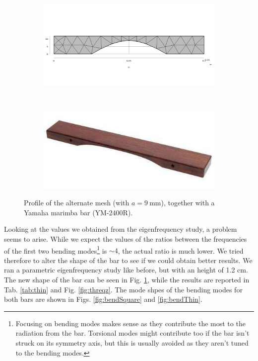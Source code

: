 \documentclass[a4paper]{article}
\begin{document}
\begin{figure}[h]
	\centering
	\begin{subfigure}{0.47\linewidth}
		\centering
		\includegraphics[width=0.95\linewidth]{newmesh.png}
	\end{subfigure}
	~
	\begin{subfigure}{0.47\linewidth}
		\centering
		\includegraphics[width=0.95\linewidth]{yamaha.jpg}
	\end{subfigure}
	\caption{Profile of the alternate mesh (with $a=9~\si{\milli\meter}$), together with a Yamaha marimba bar (YM-2400R).}
	\label{fig:thin}
\end{figure}


Looking at the values we obtained from the eigenfrequency study, a problem seems to arise. While we expect the values of the ratios between the frequencies of the first two bending modes\footnote{Focusing on bending modes makes sense as they contribute the most to the radiation from the bar. Torsional modes might contribute too if the bar isn't struck on its symmetry axis, but this is usually avoided as they aren't tuned to the bending modes.} is $\sim 4$, the actual ratio is much lower. We tried therefore to alter the shape of the bar to see if we could obtain better results. We ran a parametric eigenfrequency study like before, but with an height of 1.2 cm. The new shape of the bar can be seen in Fig. \ref{fig:thin}, while the results are reported in Tab. \ref{tab:thin} and Fig. \ref{fig:threqz}. The mode shpes of the bending modes for both bars are shown in Figs. \ref{fig:bendSquare} and \ref{fig:bendThin}.
\end{document}

